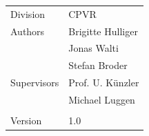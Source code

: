 \begin{titlepage}
\begin{flushleft}
\begin{tabular}{p{5cm}p{8cm}}
\Large{Division} & \Large{CPVR}\\[0.2cm]
\Large{Authors} & \Large{Brigitte Hulliger}\\[0.2cm]
& \Large{Jonas Walti}\\[0.2cm]
& \Large{Stefan Broder}\\[0.2cm]
\Large{Supervisors} & \Large{Prof. U. K\"unzler} \\[0.2cm]
& \Large{Michael Luggen }\\[0.2cm]
& \\[0.2cm]
\Large{Version} & \Large{1.0}\\
\end{tabular} 

 \end{flushleft}
\end{titlepage}
